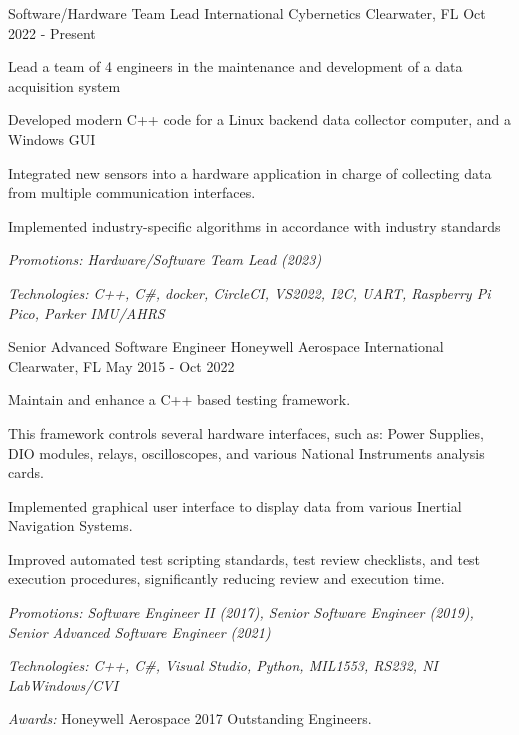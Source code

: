 

\begin{cventries}

  \cventry
    {Software/Hardware Team Lead} %
    {International Cybernetics} %
    {Clearwater, FL} %
    {Oct 2022 - Present} %
    {
      \begin{cvitems} %
        \item {Lead a team of 4 engineers in the maintenance and development of a data acquisition system}
        \item {Developed modern C++ code for a Linux backend data collector computer, and a Windows GUI}
        \item {Integrated new sensors into a hardware application in charge of collecting data from multiple communication interfaces.}
        \item {Implemented industry-specific algorithms in accordance with industry standards}
        \item {\it{Promotions:} Hardware/Software Team Lead (2023)}
      \item {\it{Technologies:} C++, C\#, docker, CircleCI, VS2022, I2C, UART, Raspberry Pi Pico, Parker IMU/AHRS}
    \end{cvitems}
    }
  \cventry
    {Senior Advanced Software Engineer} %
    {Honeywell Aerospace International} %
    {Clearwater, FL} %
    {May 2015 - Oct 2022} %
    {
      \begin{cvitems} %
        \item {Maintain and enhance a C++ based testing framework.}
				\item {This framework controls several hardware interfaces, such as: Power Supplies, DIO modules, relays, oscilloscopes, and various National Instruments analysis cards.}
        \item {Implemented graphical user interface to display data from various Inertial Navigation Systems.}
				\item {Improved automated test scripting standards, test review checklists, and test execution procedures, significantly reducing review and execution time.}
        \item {\it{Promotions:} Software Engineer II (2017), Senior Software Engineer (2019), Senior Advanced Software Engineer (2021)}
        \item {\it{Technologies:} C++, C\#, Visual Studio, Python, MIL1553, RS232, NI LabWindows/CVI}
				\item {{\it Awards:} Honeywell Aerospace 2017 Outstanding Engineers.}
      \end{cvitems}
    }


\end{cventries}

